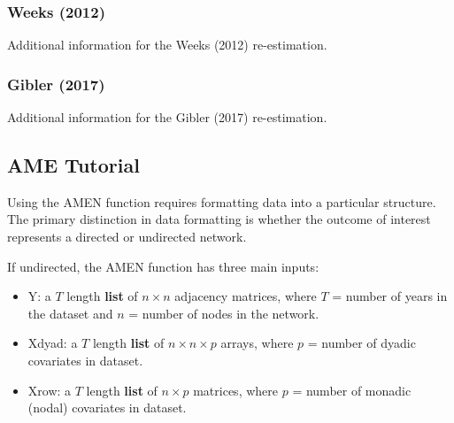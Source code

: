 \subsubsection*{Weeks (2012)}

Additional information for the Weeks (2012) re-estimation. 


\FloatBarrier

\FloatBarrier
\clearpage

\subsubsection*{Gibler (2017)}

Additional information for the Gibler (2017) re-estimation. 


\FloatBarrier

\FloatBarrier
\clearpage

\subsection*{AME Tutorial}

Using the AMEN function requires formatting data into a particular structure. The primary distinction in data formatting is whether the outcome of interest represents a directed or undirected network. 

If undirected, the AMEN function has three main inputs:

\begin{itemize}[noitemsep,nolistsep]
    \item Y: a $T$ length \textbf{list} of $n\times n$ adjacency matrices, where $T$ = number of years in the dataset and $n$ = number of nodes in the network.
    \item Xdyad: a $T$ length \textbf{list} of $n\times n\times p$ arrays, where $p$ = number of dyadic covariates in dataset. 
    \item Xrow: a $T$ length \textbf{list} of $n\times p$ matrices, where $p$ = number of monadic (nodal) covariates in dataset. 
\end{itemize}

